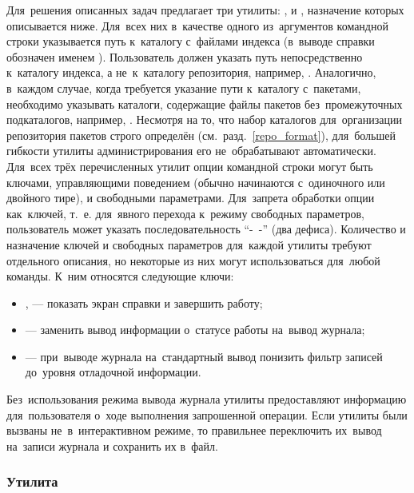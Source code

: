 Для~решения описанных задач \ds предлагает три утилиты:
,
 и
,
назначение которых описывается ниже.
Для~всех них в~качестве одного из~аргументов командной строки указывается путь к~каталогу с~файлами индекса (в~выводе справки обозначен именем ).
Пользователь должен указать путь непосредственно к~каталогу индекса,
а не~к~каталогу репозитория,
например, . 
Аналогично, в~каждом случае, когда требуется указание пути к~каталогу с~пакетами, необходимо указывать каталоги,
содержащие файлы пакетов без~промежуточных подкаталогов,
например, .
Несмотря на то, что набор каталогов для~организации репозитория пакетов \ds строго определён (см.~разд.~\ref{repo_format}),
для~большей гибкости  утилиты администрирования  его не~обрабатывают автоматически.
Для~всех трёх перечисленных утилит опции командной строки могут быть ключами, управляющими поведением (обычно начинаются с~одиночного или двойного тире), и свободными параметрами.
Для~запрета обработки опции как~ключей, т.~е. для~явного перехода к~режиму свободных параметров,
 пользователь может указать последовательность ``-~-'' (два дефиса). %
Количество и назначение ключей и свободных параметров для~каждой утилиты требуют отдельного   описания,
но некоторые из них могут использоваться для~любой команды. 
К~ним относятся следующие ключи:

\begin{itemize}

\item {
,  --- показать экран справки и завершить работу; %
}

\item {
 --- заменить вывод информации о~статусе работы на~вывод журнала; %
}

\item {
 --- при~выводе журнала  на~стандартный вывод понизить фильтр записей до~уровня отладочной информации. %
}

\end{itemize}

Без~использования режима вывода журнала утилиты предоставляют информацию для~пользователя о~ходе выполнения запрошенной операции.
Если утилиты были вызваны не~в~интерактивном режиме, то правильнее переключить их~вывод на~записи журнала и сохранить их в~файл. 

\subsubsection{Утилита }

